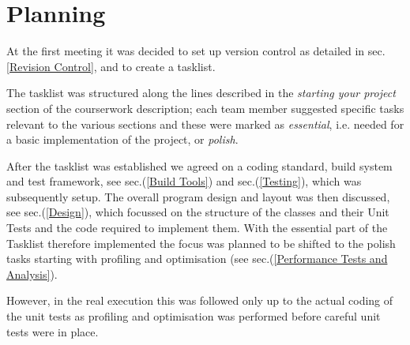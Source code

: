 \section{Planning}
\label{Planning}
At the first meeting it was decided to set up version control as detailed in sec.\ref{Revision Control}, and to create a tasklist.

The tasklist was structured along the lines described in the \textit{starting your project} section of the courserwork description; each team member suggested specific tasks relevant to the various sections and these were marked as \textit{essential}, i.e. needed for a basic implementation of the project, or \textit{polish}.

After the tasklist was established we agreed on a coding standard, build system and test framework, see sec.(\ref{Build Tools}) and sec.(\ref{Testing}), which was subsequently setup.
The overall program design and layout was then discussed, see sec.(\ref{Design}), which focussed on the structure of the classes and their Unit Tests and the code required to implement them.
With the essential part of the Tasklist therefore implemented the focus was planned to be shifted to the polish tasks starting with profiling and optimisation (see sec.(\ref{Performance Tests and Analysis}).

However, in the real execution this was followed only up to the actual coding of the unit tests as profiling and optimisation was performed before careful unit tests were in place. 
